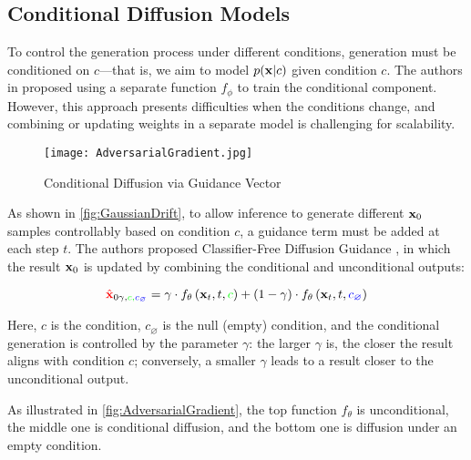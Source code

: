 \subsection{Conditional Diffusion Models}
\label{subsec:DiffusionCondition}

To control the generation process under different conditions, generation must be conditioned on $c$—that is, we aim to model $p(\mathbf{x} | c)$ given condition $c$. The authors in \cite{dhariwal2021diffusion} proposed using a separate function $f_{\phi}$ to train the conditional component. However, this approach presents difficulties when the conditions change, and combining or updating weights in a separate model is challenging for scalability.

\begin{figure}[h]
	\captionsetup{skip=20pt}
	\texttt{[image: AdversarialGradient.jpg]}
	\caption{Conditional Diffusion via Guidance Vector}
	\label{fig:AdversarialGradient}
\end{figure}

As shown in \autoref{fig:GaussianDrift}, to allow inference to generate different $\mathbf{x}_0$ samples controllably based on condition $c$, a guidance term must be added at each step $t$. The authors proposed Classifier-Free Diffusion Guidance \cite{ho2022classifier}, in which the result $\mathbf{x}_0$ is updated by combining the conditional and unconditional outputs:

\begin{equation}
{\color{red}{\hat{\mathbf{x}}}}_{0 \gamma, \color{green}{c}, \color{blue}{c_{\varnothing}}}=\gamma \cdot f_{\theta} \left(\mathbf{x}_{t}, t, {\color{green}{c}} \right)+(1-\gamma) \cdot f_{\theta} \left(\mathbf{x}_{t}, t, {\color{blue}{c_{\varnothing}}} \right)
\end{equation}

Here, $c$ is the condition, $c_{\varnothing}$ is the null (empty) condition, and the conditional generation is controlled by the parameter $\gamma$: the larger $\gamma$ is, the closer the result aligns with condition $c$; conversely, a smaller $\gamma$ leads to a result closer to the unconditional output.

As illustrated in \autoref{fig:AdversarialGradient}, the top function $f_{\theta}$ is unconditional, the middle one is conditional diffusion, and the bottom one is diffusion under an empty condition.
